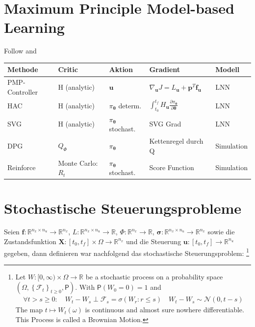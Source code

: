 \documentclass[a4paper, 12pt]{scrartcl}
\begin{document}
\newpage


\section{Maximum Principle Model-based Learning}

Follow \cite{PMP_controller} and \cite{HAC_controller} 
%

\begin{tabular}{lllll}
    Methode         & Critic            & Aktion    & Gradient & Modell \\ \hline
    PMP-Controller  & H (analytic)   & $\bm{u}$  & $\nabla_{\bm{u}} J = L_{\bm{u}} + \bm{p}^T \bm{f}_{\bm{u}}$ & LNN \\
    HAC             & H (analytic)   & $\pi_{\bm{\theta}}$ determ.  
        & $\int_{t_0}^{t_f} H_{\bm{u}} \frac{\partial \pi_{\bm{\theta}}}{\partial \bm{\theta}}$ 
        & LNN 
    \\
    SVG & H (analytic) & $\pi_{\bm{\theta}}$ stochast. & SVG Grad & LNN
    \\
    DPG & $Q_{\Phi}$ & $\pi_{\bm{\theta}}$ & Kettenregel durch Q & Simulation 
    \\
    Reinforce &  Monte Carlo: $R_t$ &  $\pi_{\bm{\theta}}$ stochast. & Score Function & Simulation
\end{tabular}

\newpage

\section{Stochastische Steuerungsprobleme}

Seien 
$\bm{f}: \mathbb{R}^{n_x \times n_u} \to \mathbb{R}^{n_x}$, 
$L:\mathbb{R}^{n_x \times n_u} \to \mathbb{R}$,
$\Phi:\mathbb{R}^{n_x} \to \mathbb{R}$,
$\bm{\sigma}:\mathbb{R}^{n_x \times n_u} \to \mathbb{R}^{n_x}$ 
sowie die Zustandsfunktion
$\bm{X}:[t_0,t_f] \times \Omega \to \mathbb{R}^{n_x}$
und die Steuerung
$\bm{u}:[t_0,t_f] \to \mathbb{R}^{n_u}$
gegeben, dann definieren war nachfolgend das stochastische Steuerungsproblem:
\footnote{
    Let $W:[0,\infty) \times \Omega \to \mathbb{R}$ be a stochastic process
    on a probability space $(\Omega, \left\{\mathcal{F}_t\right\}_{t\geq 0}, \mathsf{P})$. 
    With $\mathsf{P}(W_0 = 0) =1$ and
    \begin{align*}
        \forall t > s \geq 0:
        \quad
        W_t - W_s \perp \mathcal{F}_s = \sigma( W_r : r \leq s ) 
        \quad 
        W_{t} - W_s \sim \mathcal{N}(0,t- s)
    \end{align*}
    The map $t \mapsto W_t(\omega)$ is continuous and almost sure nowhere differentiable.
    This Process is called a Brownian Motion.
}
\end{document}
